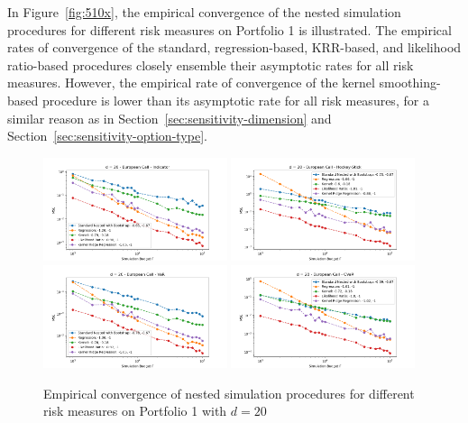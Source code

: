 \documentclass{article}
\begin{document}
In Figure~\ref{fig:510x}, the empirical convergence of the nested simulation procedures for different risk measures on Portfolio 1 is illustrated.
The empirical rates of convergence of the standard, regression-based, KRR-based, and likelihood ratio-based procedures closely ensemble their asymptotic rates for all risk measures.
However, the empirical rate of convergence of the kernel smoothing-based procedure is lower than its asymptotic rate for all risk measures, for a similar reason as in Section~\ref{sec:sensitivity-dimension} and Section~\ref{sec:sensitivity-option-type}.

\begin{figure}[ht!] 
    \centering
    \includegraphics[width=0.48\textwidth]{./figures/convergence/1101.png}
    \includegraphics[width=0.48\textwidth]{./figures/convergence/1102.png}
    \includegraphics[width=0.48\textwidth]{./figures/convergence/1104.png}
    \includegraphics[width=0.48\textwidth]{./figures/convergence/1105.png}
    \caption{Empirical convergence of nested simulation procedures for different risk measures on Portfolio 1 with $d=20$}
    \label{fig:110x}
\end{figure}
\end{document}
